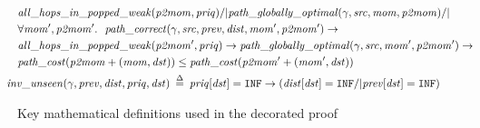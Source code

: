\begin{figure}
\begin{equation*}
\begin{split}
&\m{all\_hops\_in\_popped\_weak}(\m{p2mom}, \m{priq}) /| \m{path\_globally\_optimal}(\gamma, \m{src}, \m{mom}, \m{p2mom}) /| \null \\
&\forall \m{mom', p2mom'}.~~\m{path\_correct}(\gamma, \m{src}, \m{prev}, \m{dist}, \m{mom'}, \m{p2mom'}) -> \\
&\m{all\_hops\_in\_popped\_weak}(\m{p2mom'}, \m{priq}) -> 
\m{path\_globally\_optimal}(\gamma, \m{src}, \m{mom'}, \m{p2mom'}) -> \\
&\m{path\_cost}(\m{p2mom} + \m{(mom, dst)}) \le \m{path\_cost}(\m{p2mom'} + \m{(mom', dst)}) \\
\vspace{1em}
&\!\!\!\!\!\!\m{inv\_unseen}(\gamma, \m{prev}, \m{dist}, \m{priq}, \m{dst}) \; \defeq \; \m{priq}[\m{dst}] = \texttt{INF} ->
(\m{dist}[\m{dst}] = \texttt{INF} /| \m{prev}[\m{dst}] = \texttt{INF})
\end{split}  
\end{equation*}
\caption{Key mathematical definitions used in the decorated proof}
\label{fig:defns}
\end{figure}